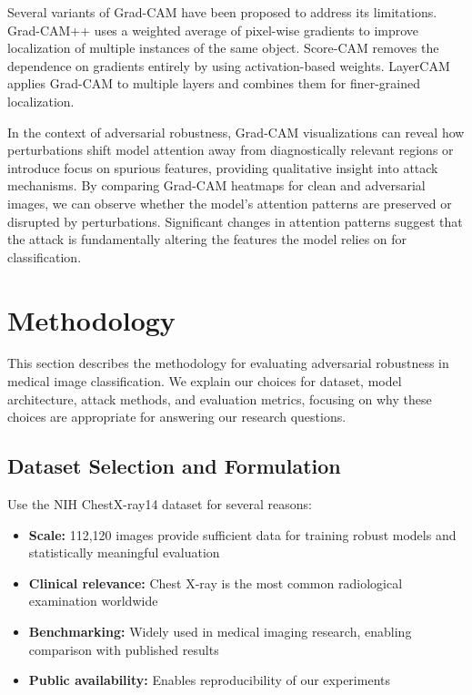 \documentclass[12pt,a4paper]{article}
\begin{document}
Several variants of Grad-CAM have been proposed to address its limitations. Grad-CAM++ \cite{chattopadhay2018} uses a weighted average of pixel-wise gradients to improve localization of multiple instances of the same object. Score-CAM \cite{wang2020} removes the dependence on gradients entirely by using activation-based weights. LayerCAM \cite{jiang2021} applies Grad-CAM to multiple layers and combines them for finer-grained localization.

In the context of adversarial robustness, Grad-CAM visualizations can reveal how perturbations shift model attention away from diagnostically relevant regions or introduce focus on spurious features, providing qualitative insight into attack mechanisms. By comparing Grad-CAM heatmaps for clean and adversarial images, we can observe whether the model's attention patterns are preserved or disrupted by perturbations. Significant changes in attention patterns suggest that the attack is fundamentally altering the features the model relies on for classification.

\section{Methodology}
\label{sec:methodology}

This section describes the methodology for evaluating adversarial robustness in medical image classification. We explain our choices for dataset, model architecture, attack methods, and evaluation metrics, focusing on why these choices are appropriate for answering our research questions.

\subsection{Dataset Selection and Formulation}

Use the NIH ChestX-ray14 dataset \cite{wang2017} for several reasons:
\begin{itemize}[leftmargin=*]
    \item \textbf{Scale:} 112,120 images provide sufficient data for training robust models and statistically meaningful evaluation
    \item \textbf{Clinical relevance:} Chest X-ray is the most common radiological examination worldwide
    \item \textbf{Benchmarking:} Widely used in medical imaging research, enabling comparison with published results
    \item \textbf{Public availability:} Enables reproducibility of our experiments
\end{itemize}
\end{document}
